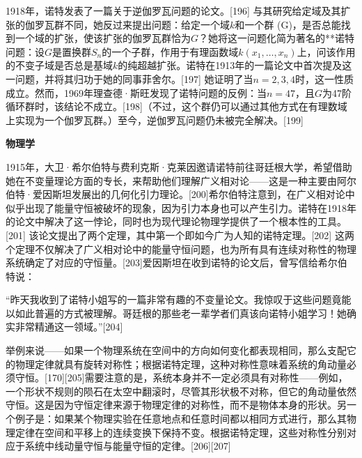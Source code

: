 1918年，诺特发表了一篇关于逆伽罗瓦问题的论文。[196] 与其研究给定域及其扩张的伽罗瓦群不同，她反过来提出问题：给定一个域$k$和一个群 (G)，是否总能找到一个域的扩张，使该扩张的伽罗瓦群恰为$G$？她将这一问题化简为著名的**诺特问题：设$G$是置换群$S_n$的一个子群，作用于有理函数域$k(x_1, \ldots, x_n)$上，问该作用的不变子域是否总是基域$k$的纯超越扩张。诺特在1913年的一篇论文中首次提及这一问题，并将其归功于她的同事菲舍尔。[197] 她证明了当$n = 2, 3, 4$时，这一性质成立。然而，1969年理查德·斯旺发现了诺特问题的反例：当$n = 47$，且$G$为47阶循环群时，该结论不成立。[198]（不过，这个群仍可以通过其他方式在有理数域上实现为一个伽罗瓦群。）至今，逆伽罗瓦问题仍未被完全解决。[199]

\textbf{物理学}

1915年，大卫·希尔伯特与费利克斯·克莱因邀请诺特前往哥廷根大学，希望借助她在不变量理论方面的专长，来帮助他们理解广义相对论——这是一种主要由阿尔伯特·爱因斯坦发展出的几何化引力理论。[200]希尔伯特注意到，在广义相对论中似乎出现了能量守恒被破坏的现象，因为引力本身也可以产生引力。诺特在1918年的论文中解决了这一悖论，同时也为现代理论物理学提供了一个根本性的工具。[201] 该论文提出了两个定理，其中第一个即如今广为人知的诺特定理。[202] 这两个定理不仅解决了广义相对论中的能量守恒问题，也为所有具有连续对称性的物理系统确定了对应的守恒量。[203]爱因斯坦在收到诺特的论文后，曾写信给希尔伯特说：

“昨天我收到了诺特小姐写的一篇非常有趣的不变量论文。我惊叹于这些问题竟能以如此普遍的方式被理解。哥廷根的那些老一辈学者们真该向诺特小姐学习！她确实非常精通这一领域。”[204]

举例来说——如果一个物理系统在空间中的方向如何变化都表现相同，那么支配它的物理定律就具有旋转对称性；根据诺特定理，这种对称性意味着系统的角动量必须守恒。[170][205]需要注意的是，系统本身并不一定必须具有对称性——例如，一个形状不规则的陨石在太空中翻滚时，尽管其形状极不对称，但它的角动量依然守恒。这是因为守恒定律来源于物理定律的对称性，而不是物体本身的形状。另一个例子是：如果某个物理实验在任意地点和任意时间都以相同方式进行，那么其物理定律在空间和平移上的连续变换下保持不变。根据诺特定理，这些对称性分别对应于系统中线动量守恒与能量守恒的定律。[206][207]
